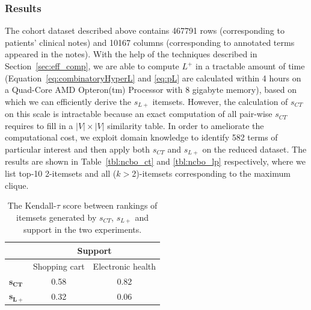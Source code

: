 \subsubsection{Results}
The cohort dataset described above contains 467791 rows (corresponding to patients' clinical notes) and 10167 columns (corresponding to annotated terms appeared in the notes). With the help of the techniques described in Section~\ref{sec:eff_comp}, we are able to compute $L^+$ in a tractable amount of time (Equation~\ref{eq:combinatoryHyperL} and \ref{eq:pL} are calculated within 4 hours on a Quad-Core AMD Opteron(tm) Processor with 8 gigabyte memory), based on which we can efficiently derive the $s_{L+}$ itemsets. However, the calculation of $s_{CT}$ on this scale is intractable because an exact computation of all pair-wise $s_{CT}$ requires to fill in a $|V|\times|V|$ similarity table. In order to ameliorate the computational cost, we exploit domain knowledge to identify 582 terms of particular interest and then apply both $s_{CT}$ and $s_{L+}$ on the reduced dataset. The results are shown in Table~\ref{tbl:ncbo_ct} and \ref{tbl:ncbo_lp} respectively, where we list top-10 2-itemsets and all ($k>$2)-itemsets corresponding to the maximum clique.

\begin{table}
\begin{center}
\begin{tabular}{l|c|c }
\hline
&\multicolumn{2}{c}{Support} \\
\hline
              & Shopping cart  &  Electronic health\\
\hline
$\mathbf{s_{CT}}$    & 0.58  & 0.82 \\
\hline
$\mathbf{s_{L+}}$    & 0.32  & 0.06 \\
\hline
\end{tabular}
\end{center}
\caption{\label{tbl:kendall} The Kendall-$\tau$ score between rankings of itemsets generated by $s_{CT}$, $s_{L+}$ and support in the two experiments.}
\end{table}

